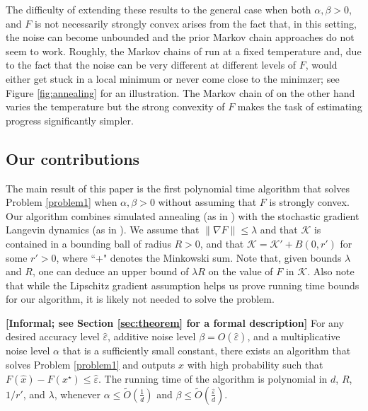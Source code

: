 \documentclass[final,12pt]{colt2018} %
\renewcommand{\epsilon}{\varepsilon}
\begin{document}
{%
% 
The difficulty of extending these results to the general case when both $\alpha,\beta >0$, and $F$ is not necessarily strongly convex arises from the fact that, in this setting, the noise can become unbounded and the prior Markov chain  approaches do not seem to work. 
%
Roughly, the Markov chains of \citep{applegate_kannan,hitting_times} run at a fixed temperature and, due to the fact that the noise can be very different at different levels of $F$, would either get stuck in  a local minimum or never come close to the minimzer; see Figure \ref{fig:annealing} for an illustration.
% 
The Markov chain of \cite{Simulated_Annealing_Nonassymptotic} on the other hand varies the temperature but the strong convexity of $F$ makes the task of estimating progress significantly simpler.
%
%


\subsection{Our contributions}
The main result of this paper is the first polynomial time algorithm that solves Problem \ref{problem1} when $\alpha,\beta>0$ without assuming that $F$ is strongly convex.
%
Our algorithm combines simulated annealing (as in \cite{Simulated_Annealing_Nonassymptotic}) with the stochastic gradient Langevin dynamics (as in \cite{hitting_times}).
%
We assume  that $\|\nabla F\| \leq \lambda$ and  that $\mathcal{K}$ is contained in a bounding ball of radius $R>0$, and that $\mathcal{K}= \mathcal{K}' + B(0,r')$ for some $r'>0$, where ``+" denotes the Minkowski sum.
%
Note that, given bounds  $\lambda$ and $R$, one can deduce an upper bound of $\lambda R$ on the value of  $F$ in $\mathcal{K}$. 
% 
Also note that while the Lipschitz gradient assumption helps us prove running time bounds for our algorithm, it is likely not needed to solve the problem.

\begin{theorem} \label{thm:summary}{\bf [Informal; see Section \ref{sec:theorem} for a formal description]}
%
%
For any desired accuracy level $\hat{\varepsilon}$, additive noise level  $\beta= O(\hat{\epsilon})$, and a multiplicative noise level $ \alpha$ that is a sufficiently small constant, 
there exists an algorithm that solves Problem \ref{problem1} and outputs $\hat{x}$ with high probability such that
  $F(\hat{x})-F(x^{\star}) \leq \hat{\varepsilon}$. 
The  running time of the algorithm is polynomial in $d$, $R$, $1/r'$, and $\lambda$, whenever $\alpha \leq \tilde{O}(\frac{1}{d})$  and $\beta \leq \tilde{O}(\frac{\hat{\varepsilon}}{d})$.
\end{theorem}

}
\end{document}
